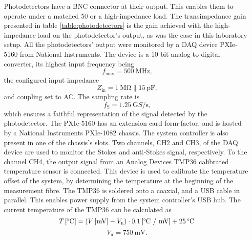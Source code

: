 \documentclass{standalone}
\begin{document}
Photodetectors have a BNC connector at their output. This enables them to operate under a matched 50 \textOmega or a high-impedance load. The transimpedance gain presented in table \ref{table:photodetectors} is the gain achieved with the high-impedance load on the photodetector's output, as was the case in this laboratory setup. All the photodetectors' output were monitored by a DAQ device PXIe-5160 from National Instruments. The device is a 10-bit analog-to-digital converter, its highest input frequency being
\begin{equation}
f_\textrm{max} = \SI{500}{\mega \hertz} \textrm{,}
\end{equation}
the configured input impedance
\begin{equation}
Z_\textrm{in} = \SI{1}{\mega \ohm} \| \SI{15}{\pico \farad} \textrm{,}
\end{equation}
and coupling set to AC. The sampling rate is
\begin{equation}
f_\textrm{S} = \SI{1.25}{\giga S / \second} \textrm{,}
\end{equation}
which ensures a faithful representation of the signal detected by the photodetector. The PXIe-5160 has an extension card form-factor, and is hosted by a National Instruments PXIe-1082 chassis. The system controller is also present in one of the chassis's slots. Two channels, CH2 and CH3, of the DAQ device are used to monitor the Stokes and anti-Stokes signal, respectively. To the channel CH4, the output signal from an Analog Devices TMP36 calibrated temperature sensor is connected. This device is used to calibrate the temperature offset of the system, by determining the temperature at the beginning of the measurement fibre. The TMP36 is soldered onto a coaxial, and a USB cable in parallel. This enables power supply from the system controller's USB hub. The current temperature of the TMP36 can be calculated as \cite{datasheet:tmp36}
\begin{equation}
T \, \textrm{[\textdegree C]} = \left( V \, \textrm{[mV]} - V_\textrm{n} \right) \cdot 0.1 \, \textrm{[\textdegree C / mV]} + 25 \, \textrm{\textdegree C}
\end{equation}
\begin{equation}
V_\textrm{n} = \SI{750}{\milli \volt} \textrm{.}
\end{equation}
\end{document}
